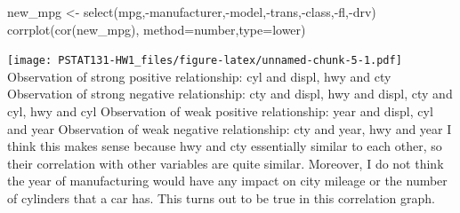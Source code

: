 \documentclass[
]{article}
\newenvironment{Shaded}{\begin{snugshade}}{\end{snugshade}}
\newcommand{\AttributeTok}[1]{\textcolor[rgb]{0.77,0.63,0.00}{#1}}
\newcommand{\FunctionTok}[1]{\textcolor[rgb]{0.00,0.00,0.00}{#1}}
\newcommand{\NormalTok}[1]{#1}
\newcommand{\OtherTok}[1]{\textcolor[rgb]{0.56,0.35,0.01}{#1}}
\newcommand{\SpecialCharTok}[1]{\textcolor[rgb]{0.00,0.00,0.00}{#1}}
\newcommand{\StringTok}[1]{\textcolor[rgb]{0.31,0.60,0.02}{#1}}
\begin{document}
\begin{Shaded}
\begin{Highlighting}[]
\NormalTok{new\_mpg }\OtherTok{\textless{}{-}} \FunctionTok{select}\NormalTok{(mpg,}\SpecialCharTok{{-}}\NormalTok{manufacturer,}\SpecialCharTok{{-}}\NormalTok{model,}\SpecialCharTok{{-}}\NormalTok{trans,}\SpecialCharTok{{-}}\NormalTok{class,}\SpecialCharTok{{-}}\NormalTok{fl,}\SpecialCharTok{{-}}\NormalTok{drv)}
\FunctionTok{corrplot}\NormalTok{(}\FunctionTok{cor}\NormalTok{(new\_mpg), }\AttributeTok{method=}\StringTok{\textquotesingle{}number\textquotesingle{}}\NormalTok{,}\AttributeTok{type=}\StringTok{\textquotesingle{}lower\textquotesingle{}}\NormalTok{)}
\end{Highlighting}
\end{Shaded}

\texttt{[image: PSTAT131-HW1\_files/figure-latex/unnamed-chunk-5-1.pdf]}
Observation of strong positive relationship: cyl and displ, hwy and cty
Observation of strong negative relationship: cty and displ, hwy and
displ, cty and cyl, hwy and cyl Observation of weak positive
relationship: year and displ, cyl and year Observation of weak negative
relationship: cty and year, hwy and year I think this makes sense
because hwy and cty essentially similar to each other, so their
correlation with other variables are quite similar. Moreover, I do not
think the year of manufacturing would have any impact on city mileage or
the number of cylinders that a car has. This turns out to be true in
this correlation graph.
\end{document}
